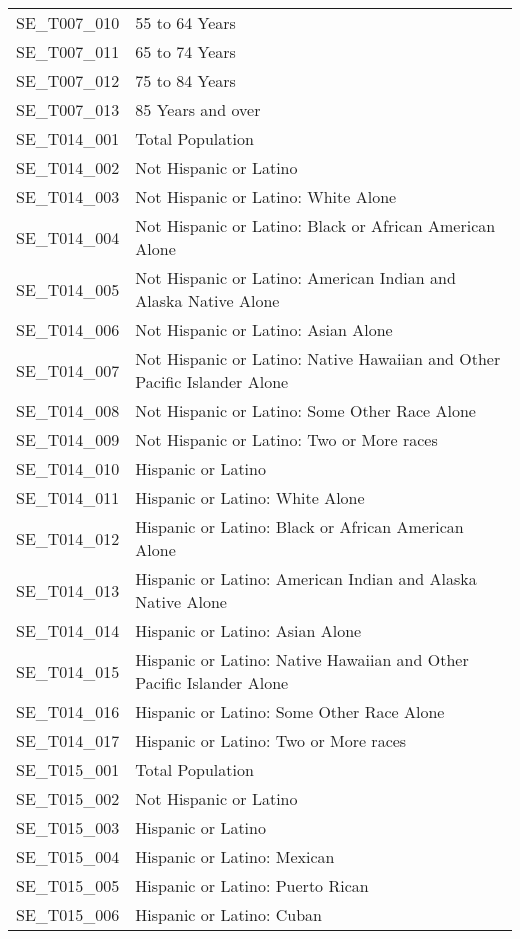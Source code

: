 \begin{longtable}{rp{5in}}
  SE\_T007\_010 & 55 to 64 Years \\ 
  SE\_T007\_011 & 65 to 74 Years \\ 
  SE\_T007\_012 & 75 to 84 Years \\ 
  SE\_T007\_013 & 85 Years and over \\ 
  SE\_T014\_001 & Total Population \\ 
  SE\_T014\_002 & Not Hispanic or Latino \\ 
  SE\_T014\_003 & Not Hispanic or Latino: White Alone \\ 
  SE\_T014\_004 & Not Hispanic or Latino: Black or African American Alone \\ 
  SE\_T014\_005 & Not Hispanic or Latino: American Indian and Alaska Native Alone \\ 
  SE\_T014\_006 & Not Hispanic or Latino: Asian Alone \\ 
  SE\_T014\_007 & Not Hispanic or Latino: Native Hawaiian and Other Pacific Islander Alone \\ 
  SE\_T014\_008 & Not Hispanic or Latino: Some Other Race Alone \\ 
  SE\_T014\_009 & Not Hispanic or Latino: Two or More races \\ 
  SE\_T014\_010 & Hispanic or Latino \\ 
  SE\_T014\_011 & Hispanic or Latino: White Alone \\ 
  SE\_T014\_012 & Hispanic or Latino: Black or African American Alone \\ 
  SE\_T014\_013 & Hispanic or Latino: American Indian and Alaska Native Alone \\ 
  SE\_T014\_014 & Hispanic or Latino: Asian Alone \\ 
  SE\_T014\_015 & Hispanic or Latino: Native Hawaiian and Other Pacific Islander Alone \\ 
  SE\_T014\_016 & Hispanic or Latino: Some Other Race Alone \\ 
  SE\_T014\_017 & Hispanic or Latino: Two or More races \\ 
  SE\_T015\_001 & Total Population \\ 
  SE\_T015\_002 & Not Hispanic or Latino \\ 
  SE\_T015\_003 & Hispanic or Latino \\ 
  SE\_T015\_004 & Hispanic or Latino: Mexican \\ 
  SE\_T015\_005 & Hispanic or Latino: Puerto Rican \\ 
  SE\_T015\_006 & Hispanic or Latino: Cuban \\ 

\end{longtable}
